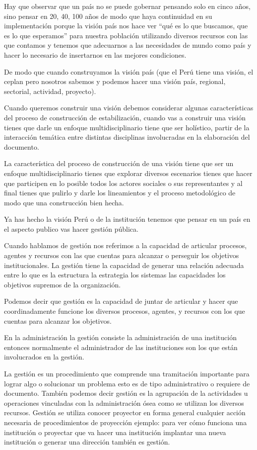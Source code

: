 \documentclass[
  jou,
  floatsintext,
  longtable,
  a4paper,
  nolmodern,
  notxfonts,
  notimes,
  12pt,
  colorlinks=true,linkcolor=blue,citecolor=blue,urlcolor=blue]{apa7}
\begin{document}
Hay que observar que un país no se puede gobernar pensando solo en cinco
años, sino pensar en 20, 40, 100 años de modo que haya continuidad en su
implementación porque la visión país nos hace ver ``qué es lo que
buscamos, que es lo que esperamos'' para nuestra población utilizando
diversos recursos con las que contamos y tenemos que adecuarnos a las
necesidades de mundo como país y hacer lo necesario de insertarnos en
las mejores condiciones.

De modo que cuando construyamos la visión país (que el Perú tiene una
visión, el ceplan pero nosotros sabemos y podemos hacer una visión país,
regional, sectorial, actividad, proyecto).

Cuando queremos construir una visión debemos considerar algunas
características del proceso de construcción de estabilización, cuando
vas a construir una visión tienes que darle un enfoque
multidisciplinario tiene que ser holístico, partir de la interacción
temática entre distintas disciplinas involucradas en la elaboración del
documento.

La característica del proceso de construcción de una visión tiene que
ser un enfoque multidisciplinario tienes que explorar diversos
escenarios tienes que hacer que participen en lo posible todos los
actores sociales o sus representantes y al final tienes que pulirlo y
darle los lineamientos y el proceso metodológico de modo que una
construcción bien hecha.

Ya has hecho la visión Perú o de la institución tenemos que pensar en un
país en el aspecto publico vas hacer gestión pública.

Cuando hablamos de gestión nos referimos a la capacidad de articular
procesos, agentes y recursos con las que cuentas para alcanzar o
perseguir los objetivos institucionales. La gestión tiene la capacidad
de generar una relación adecuada entre lo que es la estructura la
estrategia los sistemas las capacidades los objetivos supremos de la
organización.

Podemos decir que gestión es la capacidad de juntar de articular y hacer
que coordinadamente funcione los diversos procesos, agentes, y recursos
con los que cuentas para alcanzar los objetivos.

En la administración la gestión consiste la administración de una
institución entonces normalmente el administrador de las instituciones
son los que están involucrados en la gestión.

La gestión es un procedimiento que comprende una tramitación importante
para lograr algo o solucionar un problema esto es de tipo administrativo
o requiere de documento. También podemos decir gestión es la agrupación
de la actividades u operaciones vinculadas con la administración ósea
como se utilizan los diversos recursos. Gestión se utiliza conocer
proyector en forma general cualquier acción necesaria de procedimientos
de proyección ejemplo: para ver cómo funciona una institución o
proyectar que va hacer una institución implantar una nueva institución o
generar una dirección también es gestión.
\end{document}
